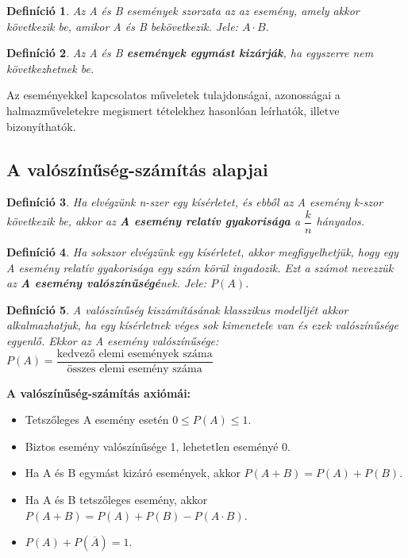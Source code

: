 \documentclass[12pt,a4paper]{article}
\newtheorem{definition}{Definíció} [section]
\begin{document}
\begin{definition}
Az A és B események szorzata az az esemény, amely akkor következik be, amikor A és B bekövetkezik. Jele: $A \cdot B$.
\end{definition}

\begin{definition}
Az A és B \textbf{események egymást kizárják}, ha egyszerre nem következhetnek be.
\end{definition}
Az eseményekkel kapcsolatos műveletek tulajdonságai, azonosságai a halmazműveletekre megismert tételekhez hasonlóan leírhatók, illetve bizonyíthatók.	

\subsection{A valószínűség-számítás alapjai}

\begin{definition}
Ha elvégzünk n-szer egy kísérletet, és ebből az A esemény k-szor következik be, akkor
az \textbf{A esemény relatív gyakorisága} a $\dfrac{k}{n}$ hányados.
\end{definition}

\begin{definition}
Ha sokszor elvégzünk egy kísérletet, akkor megfigyelhetjük, hogy egy A esemény relatív gyakorisága egy szám körül ingadozik. Ezt a számot nevezzük az \textbf{A esemény valószínűségé}nek. Jele: $P(A)$.
\end{definition}

\begin{definition}
A valószínűség kiszámításának klasszikus modelljét akkor alkalmazhatjuk, ha egy kísérletnek véges sok kimenetele van és ezek valószínűsége egyenlő. Ekkor az A esemény valószínűsége: $P(A)=\dfrac{\text{kedvező elemi események száma}}{\text{összes elemi esemény száma}}$
\end{definition}

\textbf{A valószínűség-számítás axiómái:}
\begin{itemize}
\item Tetszőleges A esemény esetén $0\leq P(A)\leq 1$.
\item Biztos esemény valószínűsége 1, lehetetlen eseményé 0.
\item Ha A és B egymást kizáró események, akkor $P(A+B)=P(A)+P(B)$.
\item  Ha A és B tetszőleges esemény, akkor $P(A+B)=P(A)+P(B)-P(A\cdot B)$.
\item $P(A)+P(\overline{A})=1$.
\end{itemize}
\end{document}
